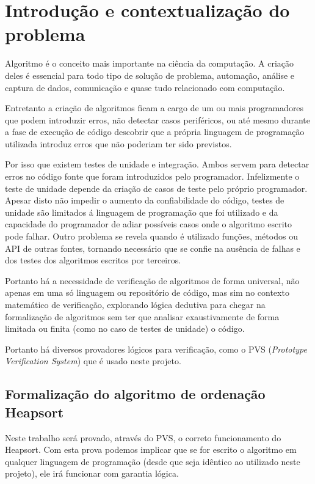 \chapter{Introdução e contextualização do problema}

Algoritmo é o conceito mais importante na ciência da computação. A criação deles é essencial para todo tipo de solução de problema, automação, análise e captura de dados, comunicação e quase tudo relacionado com computação.

Entretanto a criação de algoritmos ficam a cargo de um ou mais programadores que podem introduzir erros, não detectar casos periféricos, ou até mesmo durante a fase de execução de código descobrir que a própria linguagem de programação utilizada introduz erros que não poderiam ter sido previstos.

Por isso que existem testes de unidade e integração. Ambos servem para detectar erros no código fonte que foram introduzidos pelo programador. Infelizmente o teste de unidade depende da criação de casos de teste pelo próprio programador. Apesar disto não impedir o aumento da confiabilidade do código, testes de unidade são limitados á linguagem de programação que foi utilizado e da capacidade do programador de adiar possíveis casos onde o algoritmo escrito pode falhar. Outro problema se revela quando é utilizado funções, métodos ou API de outras fontes, tornando necessário que se confie na ausência de falhas e dos testes dos algoritmos escritos por terceiros.

Portanto há a necessidade de verificação de algoritmos de forma universal, não apenas em uma só linguagem ou repositório de código, mas sim no contexto matemático de verificação, explorando lógica dedutiva para chegar na formalização de algoritmos sem ter que analisar exaustivamente de forma limitada ou finita (como no caso de testes de unidade) o código.

Portanto há diversos provadores lógicos para verificação, como o PVS (\textit{Prototype Verification System}) que é usado neste projeto.

\section{Formalização do algoritmo de ordenação Heapsort}

Neste trabalho será provado, através do PVS, o correto funcionamento do Heapsort. Com esta prova podemos implicar que se for escrito o algoritmo em qualquer linguagem de programação (desde que seja idêntico ao utilizado neste projeto), ele irá funcionar com garantia lógica.


